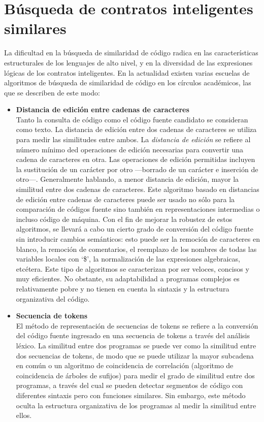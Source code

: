 \section{Búsqueda de contratos inteligentes similares}
\label{appendix:sim_code}

La dificultad en la búsqueda de similaridad de código radica en las características estructurales de los lenguajes de alto nivel, y en la diversidad de las expresiones lógicas de los contratos inteligentes. En la actualidad existen varias escuelas de algoritmos de búsqueda de similaridad de código en los círculos académicos, las que se describen de este modo:

\begin{itemize}
	\item \textbf{Distancia de edición entre cadenas de caracteres} \\
	Tanto la consulta de código como el código fuente candidato se consideran como texto. La distancia de edición entre dos cadenas de caracteres se utiliza para medir las similitudes entre ambos. La \textit{distancia de edición} se refiere al número mínimo ded operaciones de edición necesarias para convertir una cadena de caracteres en otra. Las operaciones de edición permitidas incluyen la sustitución de un carácter por otro —borrado de un carácter e inserción de otro—. Generalmente hablando, a menor distancia de edición, mayor la similitud entre dos cadenas de caracteres. Este algoritmo basado en distancias de edición entre cadenas de caracteres puede ser usado no sólo para la comparación de códigos fuente sino también en representaciones intermedias o incluso código de máquina.
	Con el fin de mejorar la robustez de estos algoritmos, se llevará a cabo un cierto grado de conversión del código fuente sin introducir cambios semánticos: esto puede ser la remoción de caracteres en blanco, la remoción de comentarios, el reemplazo de los nombres de todas las variables locales con ‘\$’, la normalización de las expresiones algebraicas, etcétera. Este tipo de algoritmos se caracterizan por ser veloces, concisos y muy eficientes. No obstante, su adaptabilidad a programas complejos es relativamente pobre y no tienen en cuenta la sintaxis y la estructura organizativa del código.

	\item \textbf{Secuencia de tokens} \\
	El método de representación de secuencias de tokens se refiere a la conversión del código fuente ingresado en una secuencia de tokens a través del análisis léxico. La similitud entre dos programas se puede ver como la similitud entre dos secuencias de tokens, de modo que se puede utilizar la mayor subcadena en común o un algoritmo de coincidencia de correlación (algoritmo de coincidencia de árboles de sufijos) para medir el grado de similitud entre dos programas, a través del cual se pueden detectar segmentos de código con diferentes sintaxis pero con funciones similares. Sin embargo, este método oculta la estructura organizativa de los programas al medir la similitud entre ellos.


\end{itemize}
